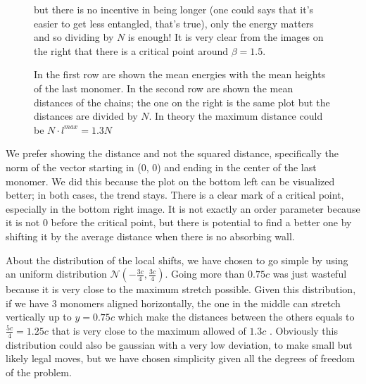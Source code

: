 \documentclass[../main.tex]{subfiles}
\begin{document}
\begin{figure}[H]
    \begin{subfigure}{.49\textwidth}
        \centering
        
    \end{subfigure}
    \begin{subfigure}{.49\textwidth}
        \centering
        
    \end{subfigure}
    \begin{subfigure}{.49\textwidth}
        \centering
        
    \end{subfigure}
        \begin{subfigure}{.49\textwidth}
        \centering
        
    \end{subfigure}
    \caption{In the first row are shown the mean energies with the mean heights of the last monomer. In the second row are shown the mean distances of the chains; the one on the right is the same plot but the distances are divided by $N$. In theory the maximum distance could be $N\cdot l^{max}=1.3N$} but there is no incentive in being longer (one could says that it's easier to get less entangled, that's true), only the energy matters and so dividing by $N$ is enough!
    It is very clear from the images on the right that there is a critical point around $\beta=1.5$.
    \label{fig: ex_6_mean_obs}
\end{figure}

We prefer showing the distance and not the squared distance, specifically the norm of the vector starting in (0, 0) and ending in the center of the last monomer. We did this because the plot on the bottom left can be visualized better; in both cases, the trend stays.
There is a clear mark of a critical point, especially in the bottom right image. It is not exactly an order parameter because it is not 0 before the critical point, but there is potential to find a better one by shifting it by the average distance when there is no absorbing wall.

About the distribution of the local shifts, we have chosen to go simple by using an uniform distribution $\mathcal{N}(-\frac{3c}{4}, \frac{3c}{4})$. Going more than $0.75c$ was just wasteful because it is very close to the maximum stretch possible. Given this distribution, if we have 3 monomers aligned horizontally, the one in the middle can stretch vertically up to $y=0.75c$ which make the distances between the others equals to $\frac{5c}{4} = 1.25c$ that is very close to the maximum allowed of $1.3c$ . Obviously this distribution could also be gaussian with a very low deviation, to make small but likely legal moves, but we have chosen simplicity given all the degrees of freedom of the problem.
\end{document}
